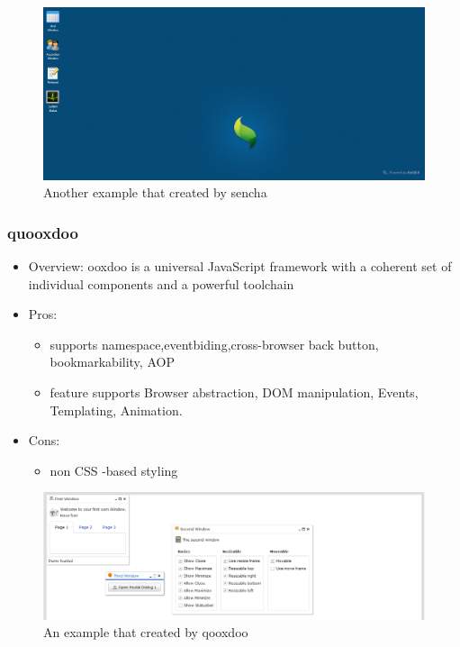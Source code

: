 \documentclass[14pt,a4paper]{extreport}
\begin{document}
			\begin{figure}
				\begin{center}
				\includegraphics[scale=0.5]{sencha1.png}
				\caption{Another example that created by sencha}
				\end{center}
			\end{figure}					
			
			
		\subsubsection{quooxdoo}
			\begin{itemize}
				\item Overview: ooxdoo is a universal JavaScript framework with a coherent set of individual components and a powerful toolchain
				\item Pros: 
					\begin{itemize}
						\item supports namespace,eventbiding,cross-browser back button, bookmarkability, AOP
						\item feature supports Browser abstraction, DOM manipulation, Events, Templating, Animation.
					\end{itemize}
				\item Cons:
					\begin{itemize}
						\item non CSS -based styling
					
					\end{itemize}
			\end{itemize}
			\begin{figure}
				\begin{center}
				\includegraphics[scale=0.6]{qooxdoo.png}
				\caption{An example that created by qooxdoo}
				\end{center}
			\end{figure}
\end{document}
